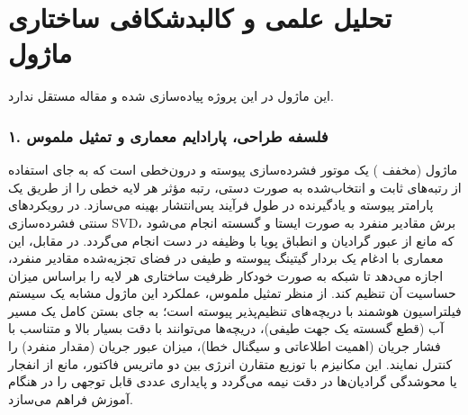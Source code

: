 \section{تحلیل علمی و کالبدشکافی ساختاری ماژول }

این ماژول در این پروژه پیاده‌سازی شده و مقاله مستقل ندارد.
\label{sec:dobi_attention}
\label{sec:mod_dobi}

\subsubsection*{۱. فلسفه طراحی، پارادایم معماری و تمثیل ملموس}
ماژول  (مخفف ) یک موتور فشرده‌سازی پیوسته و درون‌خطی  است که به جای استفاده از رتبه‌های ثابت و انتخاب‌شده به صورت دستی، رتبه مؤثر  هر لایه خطی را از طریق یک پارامتر پیوسته و یادگیرنده در طول فرآیند پس‌انتشار بهینه می‌سازد. در رویکردهای سنتی فشرده‌سازی SVD، برش مقادیر منفرد به صورت ایستا و گسسته انجام می‌شود که مانع از عبور گرادیان و انطباق پویا با وظیفه در دست انجام می‌گردد. در مقابل، این معماری با ادغام یک بردار گیتینگ پیوسته و طیفی  در فضای تجزیه‌شده مقادیر منفرد، اجازه می‌دهد تا شبکه به صورت خودکار ظرفیت ساختاری هر لایه را براساس میزان حساسیت آن تنظیم کند.
از منظر تمثیل ملموس، عملکرد این ماژول مشابه یک سیستم فیلتراسیون هوشمند با دریچه‌های تنظیم‌پذیر پیوسته است؛ به جای بستن کامل یک مسیر آب (قطع گسسته یک جهت طیفی)، دریچه‌ها می‌توانند با دقت بسیار بالا و متناسب با فشار جریان (اهمیت اطلاعاتی و سیگنال خطا)، میزان عبور جریان (مقدار منفرد) را کنترل نمایند. این مکانیزم با توزیع متقارن انرژی بین دو ماتریس فاکتور، مانع از انفجار یا محوشدگی گرادیان‌ها در دقت نیمه  می‌گردد و پایداری عددی قابل توجهی را در هنگام آموزش فراهم می‌سازد.

